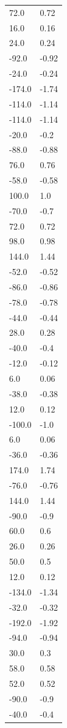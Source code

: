 \begin{longtable}{ll}
72.0 & 0.72 \\
16.0 & 0.16 \\
24.0 & 0.24 \\
-92.0 & -0.92 \\
-24.0 & -0.24 \\
-174.0 & -1.74 \\
-114.0 & -1.14 \\
-114.0 & -1.14 \\
-20.0 & -0.2 \\
-88.0 & -0.88 \\
76.0 & 0.76 \\
-58.0 & -0.58 \\
100.0 & 1.0 \\
-70.0 & -0.7 \\
72.0 & 0.72 \\
98.0 & 0.98 \\
144.0 & 1.44 \\
-52.0 & -0.52 \\
-86.0 & -0.86 \\
-78.0 & -0.78 \\
-44.0 & -0.44 \\
28.0 & 0.28 \\
-40.0 & -0.4 \\
-12.0 & -0.12 \\
6.0 & 0.06 \\
-38.0 & -0.38 \\
12.0 & 0.12 \\
-100.0 & -1.0 \\
6.0 & 0.06 \\
-36.0 & -0.36 \\
174.0 & 1.74 \\
-76.0 & -0.76 \\
144.0 & 1.44 \\
-90.0 & -0.9 \\
60.0 & 0.6 \\
26.0 & 0.26 \\
50.0 & 0.5 \\
12.0 & 0.12 \\
-134.0 & -1.34 \\
-32.0 & -0.32 \\
-192.0 & -1.92 \\
-94.0 & -0.94 \\
30.0 & 0.3 \\
58.0 & 0.58 \\
52.0 & 0.52 \\
-90.0 & -0.9 \\
-40.0 & -0.4 \\

\end{longtable}
